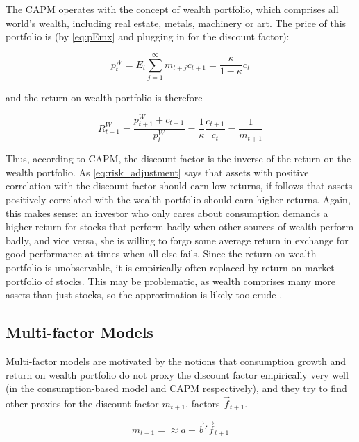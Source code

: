 	 		The CAPM operates with the concept of wealth portfolio, which comprises all world's wealth, including real estate, metals, machinery or art. The price of this portfolio is (by \ref{eq:pEmx} and plugging in for the discount factor):  
	 		
	 		\begin{equation}
	 		p_t^W  = E_t \sum_{j=1}^{\infty} m_{t+j}c_{t+1} = \frac{\kappa}{1-\kappa}c_t
	 		\end{equation}
	 		
	 		and the return on wealth portfolio is therefore 
	 		
	 		\begin{equation}
	 		R_{t+1}^W  = \frac{p_{t+1}^W + c_{t+1}}{p_t^W} = \frac{1}{\kappa} \frac{c_{t+1}}{c_t} = \frac{1}{m_{t+1}}
	 		\end{equation}
	 		
	 		Thus, according to CAPM, the discount factor is the inverse of the return on the wealth portfolio. As \ref{eq:risk_adjustment} says that assets with positive correlation with the discount factor should earn low returns, if follows that assets positively correlated with the wealth portfolio should earn higher returns. Again, this makes sense: an investor who only cares about consumption demands a higher return for stocks that perform badly when other sources of wealth perform badly, and vice versa, she is willing to forgo some average return in exchange for good performance at times when all else fails. Since the return on wealth portfolio is unobservable, it is empirically often replaced by return on market portfolio of stocks. This may be problematic, as wealth comprises many more assets than just stocks, so the approximation is likely too crude \citep{roll1977critique}.  
	 		
	 		
	 	\subsection{Multi-factor Models}
	 		
	 		Multi-factor models are motivated by the notions that consumption growth and return on wealth portfolio do not proxy the discount factor empirically very well (in the consumption-based model and CAPM respectively), and they try to find other proxies for the discount factor $m_{t+1}$, factors $\vec{f}_{t+1}$. 
	 		
	 		\begin{equation*}
	 		m_{t+1} = \approx a+\vec{b}'\vec{f}_{t+1}
	 		\end{equation*}
	 		
